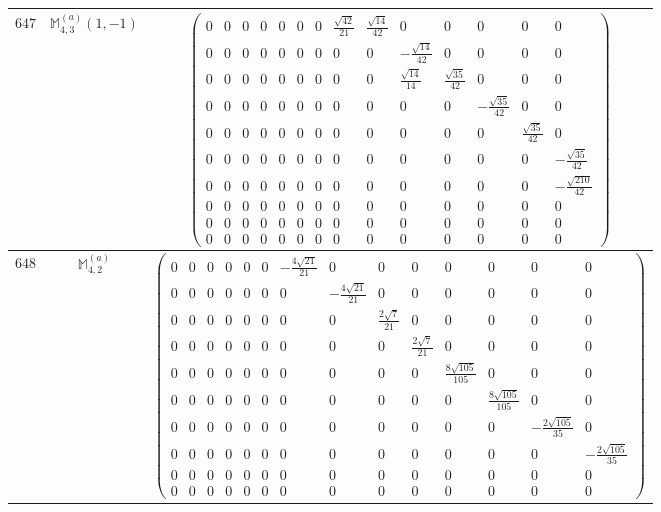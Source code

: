 \documentclass[fleqn,8pt,landscape]{jsarticle}
\begin{document}
\begin{center}
\begin{longtable}{ccc}
$ 647 $ & $ \mathbb{M}_{4,3}^{(a)}(1,-1) $ & $ \begin{pmatrix} 0 & 0 & 0 & 0 & 0 & 0 & 0 & \frac{\sqrt{42}}{21} & \frac{\sqrt{14}}{42} & 0 & 0 & 0 & 0 & 0 \\ 0 & 0 & 0 & 0 & 0 & 0 & 0 & 0 & 0 & - \frac{\sqrt{14}}{42} & 0 & 0 & 0 & 0 \\ 0 & 0 & 0 & 0 & 0 & 0 & 0 & 0 & 0 & \frac{\sqrt{14}}{14} & \frac{\sqrt{35}}{42} & 0 & 0 & 0 \\ 0 & 0 & 0 & 0 & 0 & 0 & 0 & 0 & 0 & 0 & 0 & - \frac{\sqrt{35}}{42} & 0 & 0 \\ 0 & 0 & 0 & 0 & 0 & 0 & 0 & 0 & 0 & 0 & 0 & 0 & \frac{\sqrt{35}}{42} & 0 \\ 0 & 0 & 0 & 0 & 0 & 0 & 0 & 0 & 0 & 0 & 0 & 0 & 0 & - \frac{\sqrt{35}}{42} \\ 0 & 0 & 0 & 0 & 0 & 0 & 0 & 0 & 0 & 0 & 0 & 0 & 0 & - \frac{\sqrt{210}}{42} \\ 0 & 0 & 0 & 0 & 0 & 0 & 0 & 0 & 0 & 0 & 0 & 0 & 0 & 0 \\ 0 & 0 & 0 & 0 & 0 & 0 & 0 & 0 & 0 & 0 & 0 & 0 & 0 & 0 \\ 0 & 0 & 0 & 0 & 0 & 0 & 0 & 0 & 0 & 0 & 0 & 0 & 0 & 0 \end{pmatrix} $ \\ \hline
$ 648 $ & $ \mathbb{M}_{4,2}^{(a)} $ & $ \begin{pmatrix} 0 & 0 & 0 & 0 & 0 & 0 & - \frac{4 \sqrt{21}}{21} & 0 & 0 & 0 & 0 & 0 & 0 & 0 \\ 0 & 0 & 0 & 0 & 0 & 0 & 0 & - \frac{4 \sqrt{21}}{21} & 0 & 0 & 0 & 0 & 0 & 0 \\ 0 & 0 & 0 & 0 & 0 & 0 & 0 & 0 & \frac{2 \sqrt{7}}{21} & 0 & 0 & 0 & 0 & 0 \\ 0 & 0 & 0 & 0 & 0 & 0 & 0 & 0 & 0 & \frac{2 \sqrt{7}}{21} & 0 & 0 & 0 & 0 \\ 0 & 0 & 0 & 0 & 0 & 0 & 0 & 0 & 0 & 0 & \frac{8 \sqrt{105}}{105} & 0 & 0 & 0 \\ 0 & 0 & 0 & 0 & 0 & 0 & 0 & 0 & 0 & 0 & 0 & \frac{8 \sqrt{105}}{105} & 0 & 0 \\ 0 & 0 & 0 & 0 & 0 & 0 & 0 & 0 & 0 & 0 & 0 & 0 & - \frac{2 \sqrt{105}}{35} & 0 \\ 0 & 0 & 0 & 0 & 0 & 0 & 0 & 0 & 0 & 0 & 0 & 0 & 0 & - \frac{2 \sqrt{105}}{35} \\ 0 & 0 & 0 & 0 & 0 & 0 & 0 & 0 & 0 & 0 & 0 & 0 & 0 & 0 \\ 0 & 0 & 0 & 0 & 0 & 0 & 0 & 0 & 0 & 0 & 0 & 0 & 0 & 0 \end{pmatrix} $ \\ \hline

\end{longtable}
\end{center}
\end{document}
